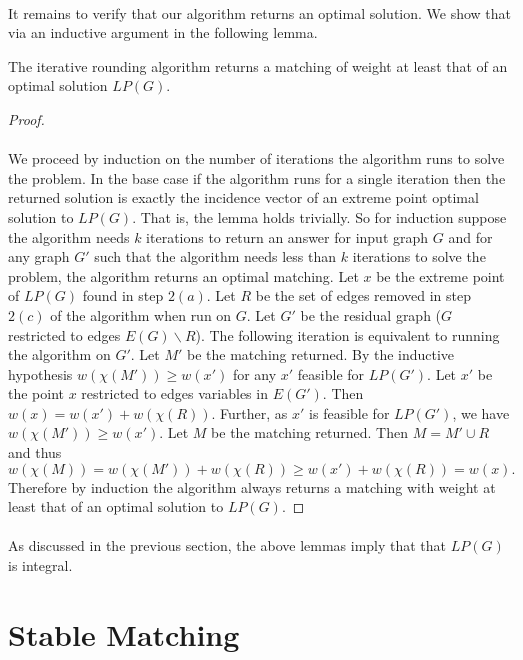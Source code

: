 \paragraph{}
It remains to verify that our algorithm returns an optimal solution. We show that via an inductive argument in the following lemma.
\begin{lemma}
The iterative rounding algorithm returns a matching of weight at least that of an optimal solution $LP(G)$.
\end{lemma}
\begin{proof}
\paragraph{}
We proceed by induction on the number of iterations the algorithm runs to solve the problem. In the base case if the algorithm runs for a single iteration then the returned solution is exactly the incidence vector of an extreme point optimal solution to $LP(G)$. That is, the lemma holds trivially. So for induction suppose the algorithm needs $k$ iterations to return an answer for input graph $G$ and for any graph $G'$ such that the algorithm needs less than $k$ iterations to solve the problem, the algorithm returns an optimal matching. Let $x$ be the extreme point of $LP(G)$ found in step $2(a)$. Let $R$ be the set of edges removed in step $2(c)$ of the algorithm when run on $G$. Let $G'$ be the residual graph ($G$ restricted to edges $E(G) \backslash R$). The following iteration is equivalent to running the algorithm on $G'$. Let $M'$ be the matching returned. By the inductive hypothesis $w(\chi(M')) \geq w(x')$ for any $x'$ feasible for $LP(G')$. Let $x'$ be the point $x$ restricted to edges variables in $E(G')$. Then $w(x) = w(x') + w(\chi(R))$. Further, as $x'$ is feasible for $LP(G')$, we have
$w(\chi(M')) \geq w(x')$. Let $M$ be the matching returned. Then $M = M' \cup R$ and thus
$$w(\chi(M)) = w(\chi(M')) + w(\chi(R)) \geq w(x') + w(\chi(R)) = w(x).$$
Therefore by induction the algorithm always returns a matching with weight at least that of an optimal solution to $LP(G)$. 
\end{proof}
\paragraph{}
As discussed in the previous section, the above lemmas imply that that $LP(G)$ is integral.
\section{Stable Matching}
